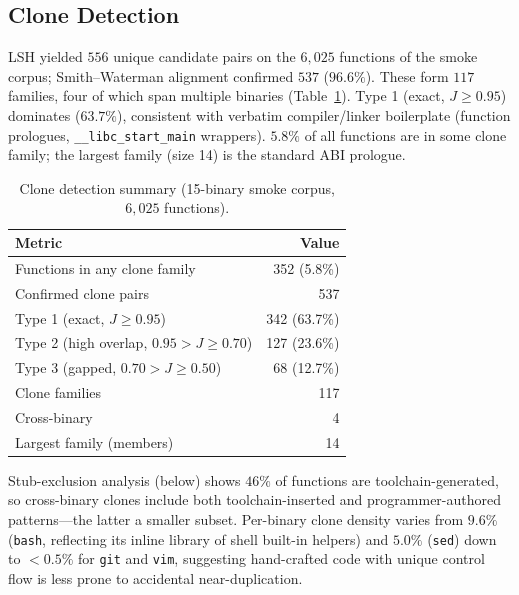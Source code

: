 \documentclass[conference]{IEEEtran}
\begin{document}
\subsection{Clone Detection}

LSH yielded $556$ unique candidate pairs on the $6{,}025$ functions of
the smoke corpus; Smith--Waterman alignment confirmed $537$ ($96.6\%$).
These form $117$ families, four of which span multiple binaries
(Table~\ref{tab:clones}).  Type 1 (exact, $J{\geq}0.95$) dominates
($63.7\%$), consistent with verbatim compiler/linker boilerplate
(function prologues, \texttt{\_\_libc\_start\_main} wrappers).  $5.8\%$
of all functions are in some clone family; the largest family (size 14)
is the standard ABI prologue.

\begin{table}[t]
\centering
\caption{Clone detection summary (15-binary smoke corpus, $6{,}025$
         functions).}
\label{tab:clones}
\begin{tabular}{@{}lr@{}}
\toprule
\textbf{Metric} & \textbf{Value} \\
\midrule
Functions in any clone family               & 352 (5.8\%) \\
Confirmed clone pairs                       & 537 \\
\quad Type 1 (exact, $J{\geq}0.95$)               & 342 (63.7\%) \\
\quad Type 2 (high overlap, $0.95{>}J{\geq}0.70$) & 127 (23.6\%) \\
\quad Type 3 (gapped, $0.70{>}J{\geq}0.50$)       & 68  (12.7\%) \\
Clone families                              & 117 \\
\quad Cross-binary                          & 4   \\
Largest family (members)                    & 14  \\
\bottomrule
\end{tabular}
\end{table}

Stub-exclusion analysis (below) shows $46\%$ of functions are
toolchain-generated, so cross-binary clones include both
toolchain-inserted and programmer-authored patterns---the latter a
smaller subset.  Per-binary clone density varies from $9.6\%$
(\texttt{bash}, reflecting its inline library of shell built-in helpers)
and $5.0\%$ (\texttt{sed}) down to ${<}0.5\%$ for \texttt{git} and
\texttt{vim}, suggesting hand-crafted code with unique control flow
is less prone to accidental near-duplication.
\end{document}
